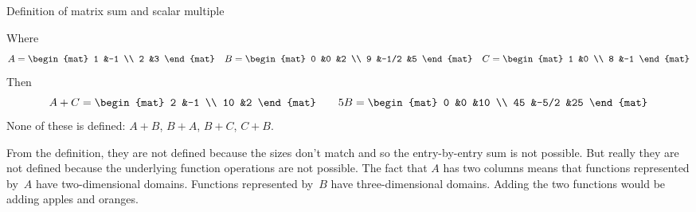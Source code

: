 \begin{frame}{Definition of matrix sum and scalar multiple}

\pause
\ex
Where
\begin{equation*}
  A=
  \begin{mat}
    1  &-1 \\
    2  &3
  \end{mat}
  \quad
  B=
  \begin{mat}
    0  &0     &2  \\
    9  &-1/2  &5
  \end{mat}
  \quad
  C=
  \begin{mat}
    1  &0 \\
    8  &-1
  \end{mat}
\end{equation*}
Then
\begin{equation*}
  A+C=
  \begin{mat}
    2  &-1  \\
    10 &2
  \end{mat}
  \qquad
  5B=
  \begin{mat}
    0  &0    &10 \\
    45 &-5/2 &25 
  \end{mat}
\end{equation*}
None of these is defined: $A+B$, $B+A$, 
$B+C$, $C+B$.

From the definition, they are not defined 
because the sizes don't match and so
the entry-by-entry sum is not possible.
But really they are not defined because the underlying function operations
are not possible.
The fact that $A$ has two columns means that
functions represented by~$A$ have two-dimensional domains.
Functions represented by~$B$ have three-dimensional domains.
Adding the two functions would be adding apples and oranges.
\end{frame}




